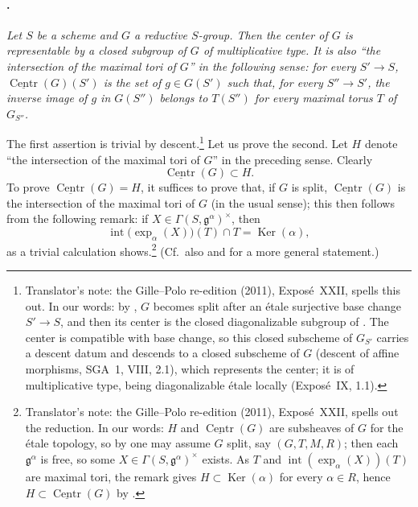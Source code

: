 \paragraph{.}
\textit{Let \(S\) be a scheme and \(G\) a reductive \(S\)-group.
Then the center of \(G\) is representable by a closed subgroup of
\(G\) of multiplicative type. It is also ``the intersection of the
maximal tori of \(G\)'' in the following sense: for every
\(S'\to S\), \(\underline{\operatorname{Centr}}(G)(S')\) is the set
of \(g\in G(S')\) such that, for every \(S''\to S'\), the inverse
image of \(g\) in \(G(S'')\) belongs to \(T(S'')\) for every maximal
torus \(T\) of \(G_{S''}\).}

The first assertion is trivial by descent.\footnote{Translator's note: the Gille--Polo re-edition (2011), Exposé~XXII,
spells this out. In our words: by , \(G\) becomes split after
an étale surjective base change \(S'\to S\), and then its center is the
closed diagonalizable subgroup of . The center is compatible
with base change, so this closed subscheme of \(G_{S'}\) carries a descent
datum and descends to a closed subscheme of \(G\) (descent of affine
morphisms, SGA~1, VIII, 2.1), which represents the center; it is of
multiplicative type, being diagonalizable étale locally (Exposé~IX, 1.1).}
Let us prove the second. Let \(H\) denote ``the
intersection of the maximal tori of \(G\)'' in the preceding sense.
Clearly
\[
  \underline{\operatorname{Centr}}(G)\subset H.
\]
To prove \(\underline{\operatorname{Centr}}(G)=H\), it suffices to prove
that, if \(G\) is split, \(\underline{\operatorname{Centr}}(G)\) is the
intersection of the maximal tori of \(G\) \textup{(in the usual sense)};
this then follows from the following remark: if
\(X\in\Gamma(S,\mathfrak g^\alpha)^\times\), then
\[
  \operatorname{int}\bigl(\exp_\alpha(X)\bigr)(T)\cap T
  =
  \operatorname{Ker}(\alpha),
\]
as a trivial calculation shows.\footnote{Translator's note: the Gille--Polo re-edition (2011), Exposé~XXII,
spells out the reduction. In our words: \(H\) and
\(\underline{\operatorname{Centr}}(G)\) are subsheaves of \(G\) for the étale
topology, so by  one may assume \(G\) split, say \((G,T,M,R)\); then
each \(\mathfrak g^\alpha\) is free, so some
\(X\in\Gamma(S,\mathfrak g^\alpha)^\times\) exists. As \(T\) and
\(\operatorname{int}(\exp_\alpha(X))(T)\) are maximal tori, the remark gives
\(H\subset\operatorname{Ker}(\alpha)\) for every \(\alpha\in R\), hence
\(H\subset\underline{\operatorname{Centr}}(G)\) by
.} \textup{(Cf.\ also  and 
for a more general statement.)}


